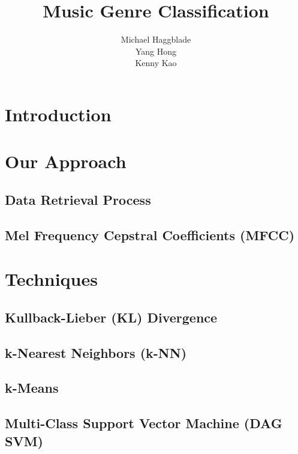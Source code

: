 \documentclass{article} %
\title{Music Genre Classification}
\author{
Michael Haggblade \\
\And
Yang Hong \\
\And
Kenny Kao
}
\begin{document}
\maketitle


\section{Introduction}



\section{Our Approach}

\subsection{Data Retrieval Process}

\subsection{Mel Frequency Cepstral Coefficients (MFCC)}


\section{Techniques}

\subsection{Kullback-Lieber (KL) Divergence}

\subsection{k-Nearest Neighbors (k-NN)}

\subsection{k-Means}

\subsection{Multi-Class Support Vector Machine (DAG SVM)}
\end{document}
